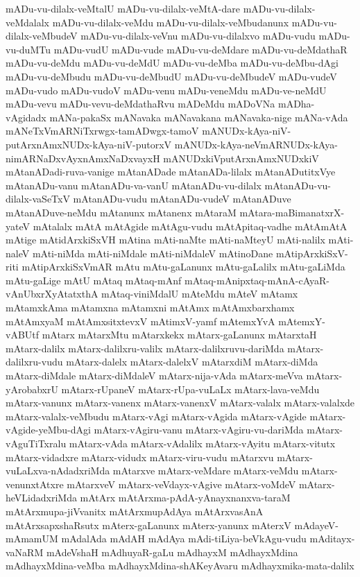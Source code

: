 {mADu-vu-dilalx-veMtalU
mADu-vu-dilalx-veMtA-dare
mADu-vu-dilalx-veMdalalx
mADu-vu-dilalx-veMdu
mADu-vu-dilalx-veMbudanunx
mADu-vu-dilalx-veMbudeV
mADu-vu-dilalx-veVnu
mADu-vu-dilalxvo
mADu-vudu
mADu-vu-duMTu
mADu-vudU
mADu-vude
mADu-vu-deMdare
mADu-vu-deMdathaR
mADu-vu-deMdu
mADu-vu-deMdU
mADu-vu-deMba
mADu-vu-deMbu-dAgi
mADu-vu-deMbudu
mADu-vu-deMbudU
mADu-vu-deMbudeV
mADu-vudeV
mADu-vudo
mADu-vudoV
mADu-venu
mADu-veneMdu
mADu-ve-neMdU
mADu-vevu
mADu-vevu-deMdathaRvu
mADeMdu
mADoVNa
mADha-vAgidadx
mANa-pakaSx
mANavaka
mANavakana
mANavaka-nige
mANa-vAda
mANeTxVmARNiTxrwgx-tamADwgx-tamoV
mANUDx-kAya-niV-putArxnAmxNUDx-kAya-niV-putorxV
mANUDx-kAya-neVmARNUDx-kAya-nimARNaDxvAyxnAmxNaDxvayxH
mANUDxkiVputArxnAmxNUDxkiV
mAtanADadi-ruva-vanige
mAtanADade
mAtanADa-lilalx
mAtanADutitxVye
mAtanADu-vanu
mAtanADu-va-vanU
mAtanADu-vu-dilalx
mAtanADu-vu-dilalx-vaSeTxV
mAtanADu-vudu
mAtanADu-vudeV
mAtanADuve
mAtanADuve-neMdu
mAtanunx
mAtanenx
mAtaraM
mAtara-maBimanatxrX-yateV
mAtalalx
mAtA
mAtAgide
mAtAgu-vudu
mAtApitaq-vadhe
mAtAmAtA
mAtige
mAtidArxkiSxVH
mAtina
mAti-naMte
mAti-naMteyU
mAti-nalilx
mAti-naleV
mAti-niMda
mAti-niMdale
mAti-niMdaleV
mAtinoDane
mAtipArxkiSxV-riti
mAtipArxkiSxVmAR
mAtu
mAtu-gaLanunx
mAtu-gaLalilx
mAtu-gaLiMda
mAtu-gaLige
mAtU
mAtaq
mAtaq-mAnf
mAtaq-mAnipxtaq-mAnA-cAyaR-vAnUbxrXyAtatxthA
mAtaq-viniMdalU
mAteMdu
mAteV
mAtamx
mAtamxkAma
mAtamxna
mAtamxni
mAtAmx
mAtAmxbarxhamx
mAtAmxyaM
mAtAmxsitxtevxV
mAtimxV-yamf
mAtemxYvA
mAtemxY-vABUtf
mAtarx
mAtarxMtu
mAtarxkekx
mAtarx-gaLanunx
mAtarxtaH
mAtarx-dalilx
mAtarx-dalilxru-valilx
mAtarx-dalilxruvu-dariMda
mAtarx-dalilxru-vudu
mAtarx-dalelx
mAtarx-dalelxV
mAtarxdiM
mAtarx-diMda
mAtarx-diMdale
mAtarx-diMdaleV
mAtarx-nija-vAda
mAtarx-meVva
mAtarx-yArobabxrU
mAtarx-rUpaneV
mAtarx-rUpa-vuLaLx
mAtarx-lava-veMdu
mAtarx-vanunx
mAtarx-vanenx
mAtarx-vanenxV
mAtarx-valalx
mAtarx-valalxde
mAtarx-valalx-veMbudu
mAtarx-vAgi
mAtarx-vAgida
mAtarx-vAgide
mAtarx-vAgide-yeMbu-dAgi
mAtarx-vAgiru-vanu
mAtarx-vAgiru-vu-dariMda
mAtarx-vAguTiTxralu
mAtarx-vAda
mAtarx-vAdalilx
mAtarx-vAyitu
mAtarx-vitutx
mAtarx-vidadxre
mAtarx-vidudx
mAtarx-viru-vudu
mAtarxvu
mAtarx-vuLaLxva-nAdadxriMda
mAtarxve
mAtarx-veMdare
mAtarx-veMdu
mAtarx-venunxtAtxre
mAtarxveV
mAtarx-veVdayx-vAgive
mAtarx-voMdeV
mAtarx-heVLidadxriMda
mAtArx
mAtArxma-pAdA-yAnayxnanxva-taraM
mAtArxmupa-jiVvanitx
mAtArxmupAdAya
mAtArxvasAnA
mAtArxsapxshaRsutx
mAterx-gaLanunx
mAterx-yanunx
mAterxV
mAdayeV-mAmamUM
mAdalAda
mAdAH
mAdAya
mAdi-tiLiya-beVkAgu-vudu
mAditayx-vaNaRM
mAdeVshaH
mAdhuyaR-gaLu
mAdhayxM
mAdhayxMdina
mAdhayxMdina-veMba
mAdhayxMdina-shAKeyAvaru
mAdhayxmika-mata-dalilx
}
